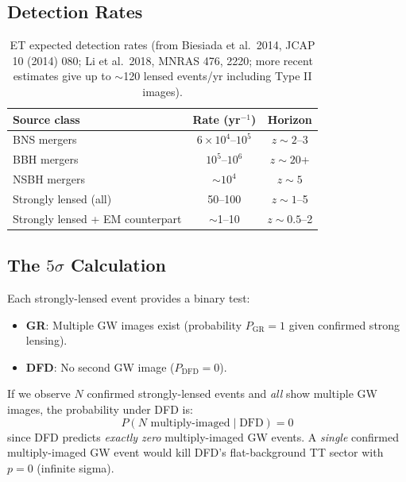 \documentclass[11pt]{article}
\theoremstyle{definition}
\theoremstyle{remark}
\newcommand{\ee}[1]{\times10^{#1}}
\begin{document}
\subsection{Detection Rates}

\begin{table}[H]
\centering
\begin{tabular}{@{}lcc@{}}
\toprule
Source class & Rate (yr$^{-1}$) & Horizon \\
\midrule
BNS mergers & $6\ee{4}$--$10^5$ & $z \sim 2$--3 \\
BBH mergers & $10^5$--$10^6$ & $z \sim 20$+ \\
NSBH mergers & $\sim$$10^4$ & $z \sim 5$ \\
Strongly lensed (all) & 50--100 & $z \sim 1$--5 \\
Strongly lensed + EM counterpart & $\sim$1--10 & $z \sim 0.5$--2 \\
\bottomrule
\end{tabular}
\caption{ET expected detection rates (from Biesiada et al.\ 2014,
  JCAP 10 (2014) 080; Li et al.\ 2018, MNRAS 476, 2220; more recent
  estimates give up to $\sim$120 lensed events/yr including Type II images).}
\label{tab:ET-rates}
\end{table}

\subsection{The $5\sigma$ Calculation}

Each strongly-lensed event provides a binary test:
\begin{itemize}[nosep]
\item \textbf{GR}: Multiple GW images exist (probability $P_{\mathrm{GR}}
  = 1$ given confirmed strong lensing).
\item \textbf{DFD}: No second GW image ($P_{\mathrm{DFD}} = 0$).
\end{itemize}

If we observe $N$ confirmed strongly-lensed events and \emph{all} show
multiple GW images, the probability under DFD is:
\begin{equation}
P(\text{$N$ multiply-imaged} \mid \text{DFD}) = 0
\end{equation}
since DFD predicts \emph{exactly zero} multiply-imaged GW events. A
\emph{single} confirmed multiply-imaged GW event would kill DFD's
flat-background TT sector with $p = 0$ (infinite sigma).
\end{document}
